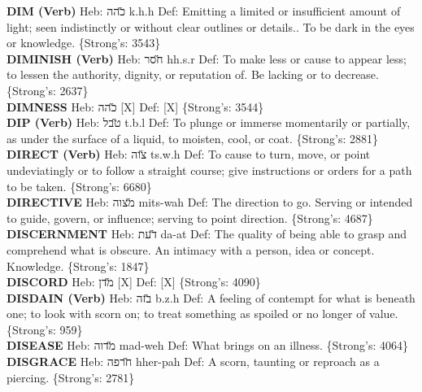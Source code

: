 {\textbf{DIM (Verb)} Heb: {\large\H כהה} k.h.h Def: Emitting a limited or insufficient amount of light; seen indistinctly or without clear outlines or details.. To be dark in the eyes or knowledge. \{Strong's: 3543\}\hfill{}\\

\textbf{DIMINISH (Verb)} Heb: {\large\H חסר} hh.s.r Def: To make less or cause to appear less; to lessen the authority, dignity, or reputation of. Be lacking or to decrease. \{Strong's: 2637\}\hfill{}\\

\textbf{DIMNESS} Heb: {\large\H כהה} {[}X{]} Def: {[}X{]} \{Strong's: 3544\}\hfill{}\\

\textbf{DIP (Verb)} Heb: {\large\H טבל} t.b.l Def: To plunge or immerse momentarily or partially, as under the surface of a liquid, to moisten, cool, or coat. \{Strong's: 2881\}\hfill{}\\

\textbf{DIRECT (Verb)} Heb: {\large\H צוה} ts.w.h Def: To cause to turn, move, or point undeviatingly or to follow a straight course; give instructions or orders for a path to be taken. \{Strong's: 6680\}\hfill{}\\

\textbf{DIRECTIVE} Heb: {\large\H מצוה} mits-wah Def: The direction to go. Serving or intended to guide, govern, or influence; serving to point direction. \{Strong's: 4687\}\hfill{}\\

\textbf{DISCERNMENT} Heb: {\large\H דעת} da-at Def: The quality of being able to grasp and comprehend what is obscure. An intimacy with a person, idea or concept. Knowledge. \{Strong's: 1847\}\hfill{}\\

\textbf{DISCORD} Heb: {\large\H מדן} {[}X{]} Def: {[}X{]} \{Strong's: 4090\}\hfill{}\\

\textbf{DISDAIN (Verb)} Heb: {\large\H בזה} b.z.h Def: A feeling of contempt for what is beneath one; to look with scorn on; to treat something as spoiled or no longer of value. \{Strong's: 959\}\hfill{}\\

\textbf{DISEASE} Heb: {\large\H מדוה} mad-weh Def: What brings on an illness. \{Strong's: 4064\}\hfill{}\\

\textbf{DISGRACE} Heb: {\large\H חרפה} hher-pah Def: A scorn, taunting or reproach as a piercing. \{Strong's: 2781\}\hfill{}\\

}
